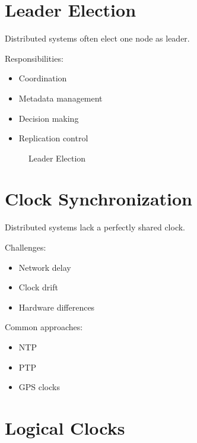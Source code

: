 \section{Leader Election}

Distributed systems often elect one node as leader.

Responsibilities:

\begin{itemize}
\item Coordination
\item Metadata management
\item Decision making
\item Replication control
\end{itemize}

\begin{figure}[H]
\centering
{}
\caption{Leader Election}
\end{figure}

\section{Clock Synchronization}

Distributed systems lack a perfectly shared clock.

Challenges:

\begin{itemize}
\item Network delay
\item Clock drift
\item Hardware differences
\end{itemize}

Common approaches:

\begin{itemize}
\item NTP
\item PTP
\item GPS clocks
\end{itemize}

\section{Logical Clocks}

